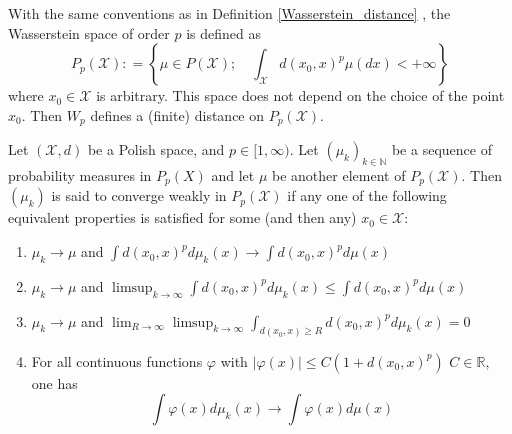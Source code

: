 \begin{defn}
	\label{Wasserstein_space}
	With the same conventions as in Definition \ref{Wasserstein_distance} , the Wasserstein space of order \( p \) is defined as
	\[
		P _ { p } ( \mathcal { X } ): = \left\{ \mu \in P ( \mathcal { X } ) ; \quad \int _ { \mathcal { X } } d \left( x _ { 0 } , x \right) ^ { p } \mu ( d x ) < + \infty \right\}
	\]
	where \( x _ { 0 } \in \mathcal { X } \) is arbitrary. This space does not depend on the choice of the point \( x _ { 0 } \). Then \( W _ { p } \) defines a (finite) distance on \( P _ { p } ( \mathcal { X } ) \).
\end{defn}

\begin{defn}
	Let \( ( \mathcal { X } , d ) \) be a Polish space, and \( p \in [ 1 , \infty ) \). Let \( \left( \mu _ { k } \right) _ { k \in \mathbb { N } } \) be a sequence of probability measures in \( P _ { p } ( X ) \) and let \( \mu \) be another element of \( P _ { p } ( \mathcal { X } ) . \) Then \( \left( \mu _ { k } \right) \) is said to converge weakly in \( P _ { p } ( \mathcal { X } ) \) if any one of the following equivalent properties is satisfied for some (and then any) \( x _ { 0 } \in \mathcal { X }: \)
	\begin{enumerate}
		\item \( \mu _ { k } \longrightarrow \mu \) and \( \int d \left( x _ { 0 } , x \right) ^ { p } d \mu _ { k } ( x ) \longrightarrow \int d \left( x _ { 0 } , x \right) ^ { p } d \mu ( x ) \)
		\item \( \mu _ { k } \longrightarrow \mu \) and \( \limsup _ { k \rightarrow \infty } \int d \left( x _ { 0 } , x \right) ^ { p } d \mu _ { k } ( x ) \leq \int d \left( x _ { 0 } , x \right) ^ { p } d \mu ( x ) \)
		\item \( \mu _ { k } \longrightarrow \mu \) and \( \lim _ { R \rightarrow \infty } \limsup _ { k \rightarrow \infty } \int _ { d \left( x _ { 0 } , x \right) \geq R } d \left( x _ { 0 } , x \right) ^ { p } d \mu _ { k } ( x ) = 0 \)
		\item For all continuous functions \( \varphi \) with \( | \varphi ( x ) | \leq C \left( 1 + d \left( x _ { 0 } , x \right) ^ { p } \right) \)
		      \( C \in \mathbb { R } \), one has
		      \[ \int \varphi ( x ) d \mu _ { k } ( x ) \longrightarrow \int \varphi ( x ) d \mu ( x ) \]
	\end{enumerate}
\end{defn}

